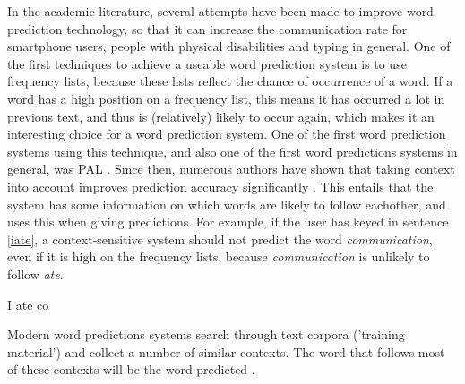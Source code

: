 \documentclass[12pt]{article}
\begin{document}
In the academic literature, several attempts have been made to improve word prediction technology, so that it can increase the communication rate for smartphone users, people with physical disabilities and typing in general. One of the first techniques to achieve a useable word prediction system is to use frequency lists, because these lists reflect the chance of occurrence of a word. If a word has a high position on a frequency list, this means it has occurred a lot in previous text, and thus is (relatively) likely to occur again, which makes it an interesting choice for a word prediction system. One of the first word prediction systems using this technique, and also one of the first word predictions systems in general, was PAL \cite{swiffin+85}. Since then, numerous authors have shown that taking context into account improves prediction accuracy significantly \cite[among others]{Lesher+99,Garay-Vitoria+06,Tanaka-Ishii07,vandenbosch+08}. This entails that the system has some information on which words are likely to follow eachother, and uses this when giving predictions. For example, if the user has keyed in sentence \ref{iate}, a context-sensitive system should not predict the word \emph{communication}, even if it is high on the frequency lists, because \emph{communication} is unlikely to follow \emph{ate}.

\begin{examples}
\item I ate co \label{iate}
\end{examples}






Modern word predictions systems search through text corpora ('training material') and collect a number of similar contexts. The word that follows most of these contexts will be the word predicted \cite[among others]{vandenbosch+08}. 
\end{document}
